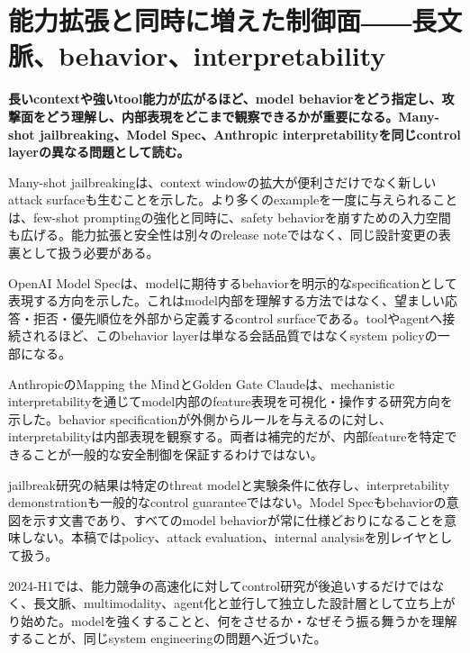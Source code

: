 \section{能力拡張と同時に増えた制御面――長文脈、behavior、interpretability}
\noindent\textbf{長いcontextや強いtool能力が広がるほど、model behaviorをどう指定し、攻撃面をどう理解し、内部表現をどこまで観察できるかが重要になる。Many-shot jailbreaking、Model Spec、Anthropic interpretabilityを同じcontrol layerの異なる問題として読む。}\autocite{src-018fb3abd44d,src-4ff5ab7d45bc,src-d1406200c99e}

Many-shot jailbreakingは、context windowの拡大が便利さだけでなく新しいattack surfaceも生むことを示した。より多くのexampleを一度に与えられることは、few-shot promptingの強化と同時に、safety behaviorを崩すための入力空間も広げる。能力拡張と安全性は別々のrelease noteではなく、同じ設計変更の表裏として扱う必要がある。\autocite{src-018fb3abd44d,src-28ee6f0f00f4,src-e91e6f80eaac}


OpenAI Model Specは、modelに期待するbehaviorを明示的なspecificationとして表現する方向を示した。これはmodel内部を理解する方法ではなく、望ましい応答・拒否・優先順位を外部から定義するcontrol surfaceである。toolやagentへ接続されるほど、このbehavior layerは単なる会話品質ではなくsystem policyの一部になる。\autocite{src-d1406200c99e}


AnthropicのMapping the MindとGolden Gate Claudeは、mechanistic interpretabilityを通じてmodel内部のfeature表現を可視化・操作する研究方向を示した。behavior specificationが外側からルールを与えるのに対し、interpretabilityは内部表現を観察する。両者は補完的だが、内部featureを特定できることが一般的な安全制御を保証するわけではない。\autocite{src-4ff5ab7d45bc}


\begin{claimboundary}
jailbreak研究の結果は特定のthreat modelと実験条件に依存し、interpretability demonstrationも一般的なcontrol guaranteeではない。Model Specもbehaviorの意図を示す文書であり、すべてのmodel behaviorが常に仕様どおりになることを意味しない。本稿ではpolicy、attack evaluation、internal analysisを別レイヤとして扱う。\autocite{src-018fb3abd44d,src-4ff5ab7d45bc,src-5019b9256d83,src-d1406200c99e}
\end{claimboundary}

2024-H1では、能力競争の高速化に対してcontrol研究が後追いするだけではなく、長文脈、multimodality、agent化と並行して独立した設計層として立ち上がり始めた。modelを強くすることと、何をさせるか・なぜそう振る舞うかを理解することが、同じsystem engineeringの問題へ近づいた。\autocite{src-018fb3abd44d,src-28ee6f0f00f4,src-4ff5ab7d45bc,src-d1406200c99e,src-e91e6f80eaac}
